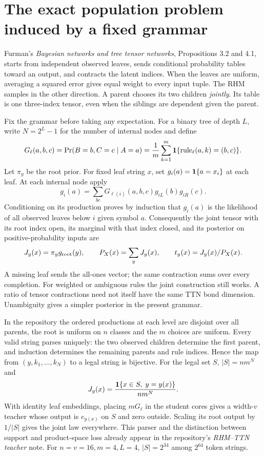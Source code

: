 \section{The exact population problem induced by a fixed grammar}
\label{sec:law}
Furman's \emph{Bayesian networks and tree tensor networks}, Propositions
3.2 and 4.1, starts from independent observed leaves, sends conditional
probability tables toward an output, and contracts the latent indices.
When the leaves are uniform, averaging a squared error gives equal weight
to every input tuple. The RHM samples in the other direction. A parent
chooses its two children \emph{jointly}. Its table is one three-index tensor,
even when the siblings are dependent given the parent.

Fix the grammar before taking any expectation. For a binary tree of depth
$L$, write $N=2^L-1$ for the number of internal nodes and define
\[
 G_\ell(a,b,c)=\Pr(B=b,C=c\mid A=a)
  =\frac1m\sum_{k=1}^m {\bf1}\{\mathrm{rule}_{\ell}(a,k)=(b,c)\}.
\]
Let $\pi_y$ be the root prior. For fixed leaf string $x$, set
$g_i(a)={\bf1}\{a=x_i\}$ at each leaf. At each internal node apply
\[
 g_i(a)=\sum_{bc}G_{\ell(i)}(a,b,c)g_{iL}(b)g_{iR}(c).
\]
Conditioning on its production proves by induction that $g_i(a)$ is
the likelihood of all observed leaves below $i$ given symbol $a$.
Consequently the joint tensor with its root index open, its marginal
with that index closed, and its posterior on positive-probability inputs are
\[
 J_y(x)=\pi_y g_{\rm root}(y),\qquad
 P_X(x)=\sum_yJ_y(x),\qquad
 t_y(x)=J_y(x)/P_X(x).
\]
A missing leaf sends the all-ones vector; the same contraction sums over
every completion. For weighted or ambiguous rules the joint construction
still works. A ratio of tensor contractions need not itself have the same TTN
bond dimension. Unambiguity gives a simpler posterior in the present grammar.

In the repository the ordered productions at each level are disjoint over
all parents, the root is uniform on $n$ classes and the $m$ choices are uniform.
Every valid string parses uniquely: the two observed children determine
the first parent, and induction determines the remaining parents and rule indices.
Hence the map from $(y,k_1,\ldots,k_N)$ to a legal string is bijective.
For the legal set $S$, $|S|=n m^N$ and
\[
 J_y(x)=\frac{{\bf1}\{x\in S,\; y=y(x)\}}{n m^N}.
\]
With identity leaf embeddings, placing $mG_\ell$ in the student cores gives
a width-$v$ teacher whose output is $e_{y(x)}$ on $S$ and zero outside.
Scaling its root output by $1/|S|$ gives the joint law everywhere.
This parser and the distinction between support and product-space loss
already appear in the repository's \emph{RHM--TTN teacher} note.
For $n=v=16,m=4,L=4$, $|S|=2^{34}$ among $2^{64}$ token strings.

